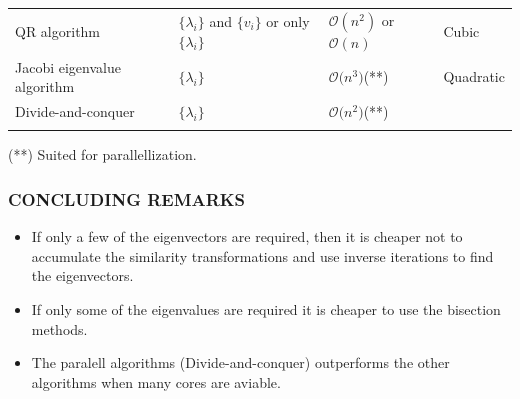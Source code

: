 \documentclass[a4paper,8pt]{beamer} %
\begin{document}
\begin{frame}
\begin{itemize}
\begin{table}
\begin{Tiny}
\begin{tabular}{llll}
							QR algorithm 				& $\{\lambda_i\}$ and $\{v_i\}$ or only $\{\lambda_i\}$ & $\mathcal O(n^2)$ or $\mathcal O(n)$ & Cubic\\
							Jacobi eigenvalue algorithm	& $\{\lambda_i\}$ 	& $\mathcal O\mathcal(n^3)$(**) & Quadratic \\
							Divide-and-conquer 			& $\{\lambda_i\}$ 	& $\mathcal O\mathcal(n^{2})$(**) & \\
							\\
							\hline
							\hline
						\end{tabular}
					\end{Tiny}
				\end{table}
				\begin{tiny}
					(**) Suited for parallellization.
				\end{tiny}
		\end{itemize}
\end{frame}%

\begin{frame}
	\frametitle{CONCLUDING REMARKS}
	\begin{itemize}
		\item If only a few of the eigenvectors are required, then it is cheaper not to accumulate the similarity 
			transformations and use inverse iterations to find the eigenvectors. 
		\item If only some of the eigenvalues are required it is cheaper to use the bisection methods.
		\item The paralell algorithms (Divide-and-conquer) outperforms the other algorithms when many cores are 
			aviable.
	\end{itemize}
\end{frame}
\end{document}
